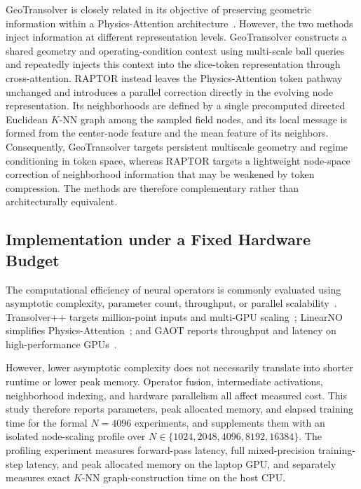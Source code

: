 \documentclass[a4paper,fleqn]{cas-sc}
\begin{document}
GeoTransolver is closely related in its objective of preserving geometric
information within a Physics-Attention architecture~\citep{ref38}.
However, the two methods inject information at different representation
levels. GeoTransolver constructs a shared geometry and operating-condition
context using multi-scale ball queries and repeatedly injects this context
into the slice-token representation through cross-attention. RAPTOR instead
leaves the Physics-Attention token pathway unchanged and introduces a
parallel correction directly in the evolving node representation. Its
neighborhoods are defined by a single precomputed directed Euclidean
$K$-NN graph among the sampled field nodes, and its local message is formed
from the center-node feature and the mean feature of its neighbors.
Consequently, GeoTransolver targets persistent multiscale geometry and
regime conditioning in token space, whereas RAPTOR targets a lightweight
node-space correction of neighborhood information that may be weakened by
token compression. The methods are therefore complementary rather than
architecturally equivalent.

\subsection{Implementation under a Fixed Hardware Budget}
\label{subsec:resource_efficiency}

The computational efficiency of neural operators is commonly evaluated using asymptotic complexity, parameter count, throughput, or parallel scalability~\citep{ref10}. Transolver++ targets million-point inputs and multi-GPU scaling~\citep{ref21}; LinearNO simplifies Physics-Attention~\citep{ref22}; and GAOT reports throughput and latency on high-performance GPUs~\citep{ref27}.

However, lower asymptotic complexity does not necessarily translate into shorter runtime or lower peak memory. Operator fusion, intermediate activations, neighborhood indexing, and hardware parallelism all affect measured cost. This study therefore reports parameters, peak allocated memory, and elapsed training time for the formal \(N=4096\) experiments, and supplements them with an isolated node-scaling profile over \(N\in\{1024,2048,4096,8192,16384\}\). The profiling experiment measures forward-pass latency, full mixed-precision training-step latency, and peak allocated memory on the laptop GPU, and separately measures exact \(K\)-NN graph-construction time on the host CPU.
\end{document}
